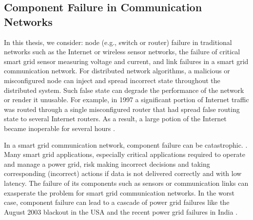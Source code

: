 \subsection{Component Failure in Communication Networks}

%



In this thesis, we consider: node (e.g., switch or router) failure in traditional networks such as the Internet or wireless sensor networks, the failure of critical smart grid sensor measuring voltage and current, and 
link failures in a smart grid communication network.
For distributed network algorithms, a malicious or misconfigured node can inject and spread incorrect state throughout the distributed system. 
Such false state can degrade the performance of the network or render it unusable. For example, in 1997 a significant portion of Internet traffic was routed through a 
single misconfigured router that had spread false routing state to several Internet routers.  As a result, a large potion of the Internet became inoperable for several hours \cite{Neumann97}. 

In a smart grid communication network, component failure can be catastrophic. . 
Many smart grid applications, especially critical applications required to operate and manage a power grid, risk making incorrect decisions and taking corresponding (incorrect) actions if data is not delivered correctly and with low latency.  
The failure of its components such as sensors or communication links can exasperate the problem for smart grid communication networks.
In the worst case, component failure can lead to a cascade of power grid failures like the August 2003 blackout in the USA \cite{2003Blackout} and the recent power grid failures in India \cite{IndiaBlackout}.






